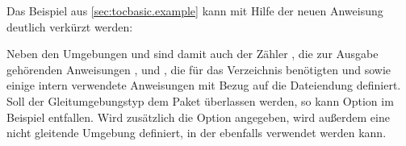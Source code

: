 \begin{Example}
  Das Beispiel aus \autoref{sec:tocbasic.example} kann mit Hilfe der neuen
  Anweisung deutlich verkürzt werden:
\begin{lstcode}
\end{lstcode}
  Neben den Umgebungen  und 
  sind damit auch der Zähler , die zur Ausgabe gehörenden
  Anweisungen ,  und
  , die für das Verzeichnis benötigten
   und  sowie einige intern
  verwendete Anweisungen mit Bezug auf die Dateiendung 
  definiert. Soll der Gleitumgebungstyp dem Paket überlassen werden, so kann
  Option  im Beispiel entfallen. Wird zusätzlich
  die Option  angegeben, wird außerdem eine nicht gleitende
  Umgebung  definiert, in der ebenfalls
   verwendet werden kann.


\end{Example}

